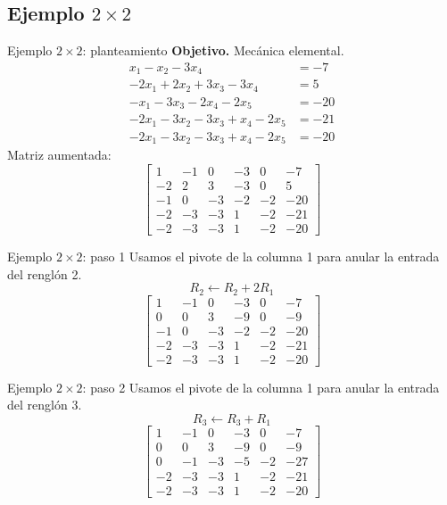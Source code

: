 \documentclass[aspectratio=169,9pt]{beamer}
\theoremstyle{remark}
\begin{document}
\subsection{Ejemplo $2\times2$}
\begin{frame}[t]{Ejemplo $2\times2$: planteamiento}
\textbf{Objetivo.} Mecánica elemental.
\[
\begin{aligned}
x_{1} - x_{2} - 3 x_{4} &= -7\\
- 2 x_{1} + 2 x_{2} + 3 x_{3} - 3 x_{4} &= 5\\
- x_{1} - 3 x_{3} - 2 x_{4} - 2 x_{5} &= -20\\
- 2 x_{1} - 3 x_{2} - 3 x_{3} + x_{4} - 2 x_{5} &= -21\\
- 2 x_{1} - 3 x_{2} - 3 x_{3} + x_{4} - 2 x_{5} &= -20
\end{aligned}
\]
Matriz aumentada:
\[
\left[\begin{array}{ccccc|c}
1 & -1 & 0 & -3 & 0 & -7\\
-2 & 2 & 3 & -3 & 0 & 5\\
-1 & 0 & -3 & -2 & -2 & -20\\
-2 & -3 & -3 & 1 & -2 & -21\\
-2 & -3 & -3 & 1 & -2 & -20
\end{array}\right]
\]
\end{frame}
\begin{frame}[t]{Ejemplo $2\times2$: paso 1}
Usamos el pivote de la columna 1 para anular la entrada del renglón 2.
\[
R_{2}\leftarrow R_{2}+2R_{1}
\]
\[
\left[\begin{array}{ccccc|c}
1 & -1 & 0 & -3 & 0 & -7\\
0 & 0 & 3 & -9 & 0 & -9\\
-1 & 0 & -3 & -2 & -2 & -20\\
-2 & -3 & -3 & 1 & -2 & -21\\
-2 & -3 & -3 & 1 & -2 & -20
\end{array}\right]
\]
\end{frame}
\begin{frame}[t]{Ejemplo $2\times2$: paso 2}
Usamos el pivote de la columna 1 para anular la entrada del renglón 3.
\[
R_{3}\leftarrow R_{3}+R_{1}
\]
\[
\left[\begin{array}{ccccc|c}
1 & -1 & 0 & -3 & 0 & -7\\
0 & 0 & 3 & -9 & 0 & -9\\
0 & -1 & -3 & -5 & -2 & -27\\
-2 & -3 & -3 & 1 & -2 & -21\\
-2 & -3 & -3 & 1 & -2 & -20
\end{array}\right]
\]
\end{frame}
\end{document}
